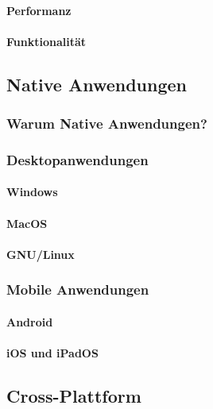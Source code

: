\documentclass[a4paper]{scrartcl}
\begin{document}
\paragraph{Performanz}

\paragraph{Funktionalität}

\subsection{Native Anwendungen}

\subsubsection{Warum Native Anwendungen?}

\subsubsection{Desktopanwendungen}

\paragraph{Windows}

\paragraph{MacOS}

\paragraph{GNU/Linux}

\subsubsection{Mobile Anwendungen}

\paragraph{Android}

\paragraph{iOS und iPadOS}

\subsection{Cross-Plattform}
\end{document}
